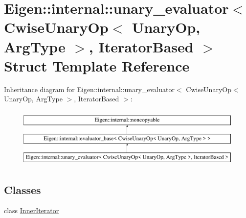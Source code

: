 \hypertarget{struct_eigen_1_1internal_1_1unary__evaluator_3_01_cwise_unary_op_3_01_unary_op_00_01_arg_type_01_4_00_01_iterator_based_01_4}{}\section{Eigen\+::internal\+::unary\+\_\+evaluator$<$ Cwise\+Unary\+Op$<$ Unary\+Op, Arg\+Type $>$, Iterator\+Based $>$ Struct Template Reference}
\label{struct_eigen_1_1internal_1_1unary__evaluator_3_01_cwise_unary_op_3_01_unary_op_00_01_arg_type_01_4_00_01_iterator_based_01_4}
Inheritance diagram for Eigen\+::internal\+::unary\+\_\+evaluator$<$ Cwise\+Unary\+Op$<$ Unary\+Op, Arg\+Type $>$, Iterator\+Based $>$\+:\begin{figure}[H]
\begin{center}
\leavevmode
\includegraphics[height=3.000000cm]{struct_eigen_1_1internal_1_1unary__evaluator_3_01_cwise_unary_op_3_01_unary_op_00_01_arg_type_01_4_00_01_iterator_based_01_4}
\end{center}
\end{figure}
\subsection*{Classes}
\begin{DoxyCompactItemize}
\item 
class \mbox{\hyperlink{class_eigen_1_1internal_1_1unary__evaluator_3_01_cwise_unary_op_3_01_unary_op_00_01_arg_type_01_629bdbe0b310981fdaf6bb6b6c73ef55}{Inner\+Iterator}}
\end{DoxyCompactItemize}
